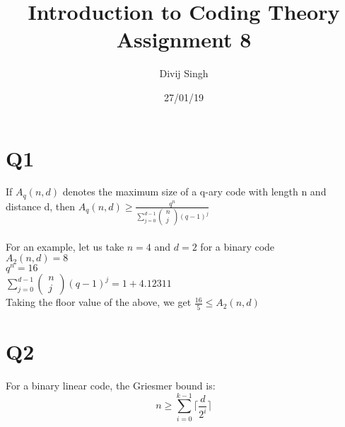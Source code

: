 \documentclass{article}
\title{Introduction to Coding Theory Assignment 8}
\author{Divij Singh}
\date{27/01/19}
\begin{document}
	\maketitle
\section{Q1}
If $A_q (n,d)$ denotes the maximum size of a q-ary code with length n and distance d, then $A_q (n,d) \geq \frac{q^n}{\sum^{d-1}_{j=0} \begin{pmatrix} n \\ j \end{pmatrix} (q-1)^j}$\\\\
For an example, let us take $n=4$ and $d=2$ for a binary code\\
$A_2(n,d) = 8$\\
$q^n = 16$\\
$\sum^{d-1}_{j=0} \begin{pmatrix} n \\ j \end{pmatrix} (q-1)^j = 1 + 4.12311$\\
Taking the floor value of the above, we get $ \frac{16}{5} \leq A_2(n,d)$


\section{Q2}

For a binary linear code, the Griesmer bound is: $$n \geq \sum^{k-1}_{i=0} \lceil \frac{d}{2^i} \rceil$$
	
\end{document}

